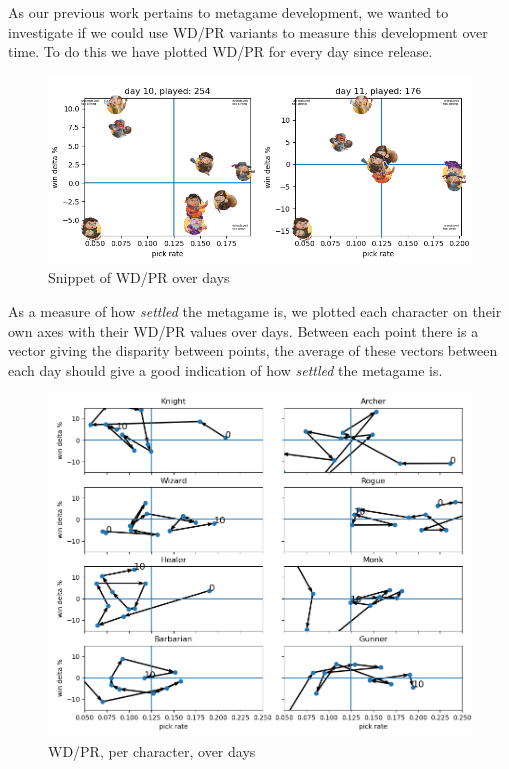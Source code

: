 \documentclass{tufte-handout}
\begin{document}
As our previous work pertains to metagame development, we wanted to investigate if we could use WD/PR variants to measure this development over time. To do this we have plotted WD/PR for every day since release. 

\begin{figure}
    \centering
    \includegraphics{pick-win-per-day-snipped.PNG}
    \caption{Snippet of WD/PR over days}
    \label{fig:my_label}
\end{figure}

As a measure of how \textit{settled} the metagame is, we plotted each character on their own axes with their WD/PR values over days. Between each point there is a vector giving the disparity between points, the average of these vectors between each day should give a good indication of how \textit{settled} the metagame is.

\begin{figure}
    \centering
    \includegraphics{pick-win-per-char.png}
    \caption{WD/PR, per character, over days}
    \label{fig:my_label}
\end{figure}
\end{document}

